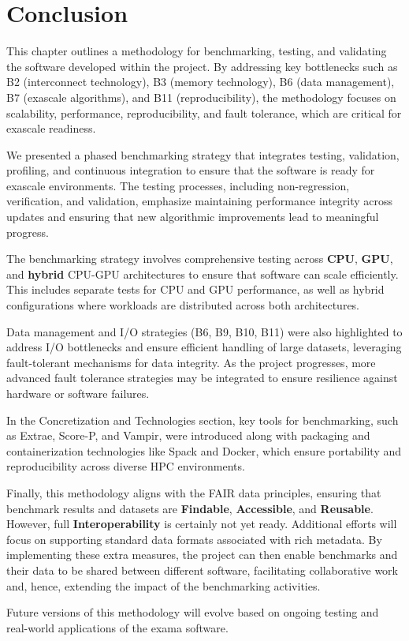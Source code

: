 \section{Conclusion}
\label{sec:Technology-conclusion}

This chapter outlines a methodology for benchmarking, testing, and validating the software developed within the \exama project. By addressing key bottlenecks such as \ac{B2} (interconnect technology), \ac{B3} (memory technology), \ac{B6} (data management), \ac{B7} (exascale algorithms), and \ac{B11} (reproducibility), the methodology focuses on scalability, performance, reproducibility, and fault tolerance, which are critical for exascale readiness.




We presented a phased benchmarking strategy that integrates testing, validation, profiling, and continuous integration to ensure that the software is ready for exascale environments. The testing processes, including non-regression, verification, and validation, emphasize maintaining performance integrity across updates and ensuring that new algorithmic improvements lead to meaningful progress.

The benchmarking strategy involves comprehensive testing across \textbf{CPU}, \textbf{GPU}, and \textbf{hybrid} CPU-GPU architectures to ensure that software can scale efficiently. This includes separate tests for CPU and GPU performance, as well as hybrid configurations where workloads are distributed across both architectures. 

Data management and I/O strategies (\ac{B6}, \ac{B9}, \ac{B10}, \ac{B11}) were also highlighted to address I/O bottlenecks and ensure efficient handling of large datasets, leveraging fault-tolerant mechanisms for data integrity. As the project progresses, more advanced fault tolerance strategies may be integrated to ensure resilience against hardware or software failures.

In the Concretization and Technologies section, key tools for benchmarking, such as Extrae, Score-P, and Vampir, were introduced along with packaging and containerization technologies like Spack and Docker, which ensure portability and reproducibility across diverse HPC environments. 

Finally, this methodology aligns with the \ac{FAIR} data principles, ensuring that benchmark results and datasets are \textbf{Findable}, \textbf{Accessible}, and \textbf{Reusable}. However, full \textbf{Interoperability} is certainly not yet ready. Additional efforts will focus on supporting standard data formats associated with rich metadata. By implementing these extra measures, the \exama project can then enable benchmarks and  their data to be shared between different software, facilitating collaborative work and, hence, extending the impact of the benchmarking activities.

Future versions of this methodology will evolve based on ongoing testing and real-world applications of the \ac{exama} software.
